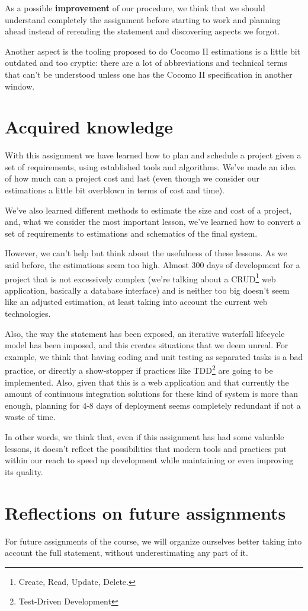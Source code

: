 As a possible \textbf{improvement} of our procedure, we think that we should understand completely the assignment before starting to work and planning ahead instead of rereading the statement and discovering aspects we forgot.

Another aspect is the tooling proposed to do Cocomo II estimations is a little bit outdated and too cryptic: there are a lot of abbreviations and technical terms that can't be understood unless one has the Cocomo II specification in another window.

\section{Acquired knowledge}

With this assignment we have learned how to plan and schedule a project given a set of requirements, using established tools and algorithms. We've made an idea of how much can a project cost and last (even though we consider our estimations a little bit overblown in terms of cost and time).

We've also learned different methods to estimate the size and cost of a project, and, what we consider the most important lesson, we've learned how to convert a set of requirements to estimations and schematics of the final system.

However, we can't help but think about the usefulness of these lessons. As we said before, the estimations seem too high. Almost 300 days of development for a project that is not excessively complex (we're talking about a CRUD\footnote{Create, Read, Update, Delete.} web application, basically a database interface) and is neither too big doesn't seem like an adjusted estimation, at least taking into account the current web technologies.

Also, the way the statement has been exposed, an iterative waterfall lifecycle model has been imposed, and this creates situations that we deem unreal. For example, we think that having coding and unit testing as separated tasks is a bad practice, or directly a show-stopper if practices like TDD\footnote{Test-Driven Development} are going to be implemented. Also, given that this is a web application and that currently the amount of continuous integration solutions for these kind of system is more than enough, planning for 4-8 days of deployment seems completely redundant if not a waste of time.

In other words, we think that, even if this assignment has had some valuable lessons, it doesn't reflect the possibilities that modern tools and practices put within our reach to speed up development while maintaining or even improving its quality.

\section{Reflections on future assignments}

For future assignments of the course, we will organize ourselves better taking into account the full statement, without underestimating any part of it.